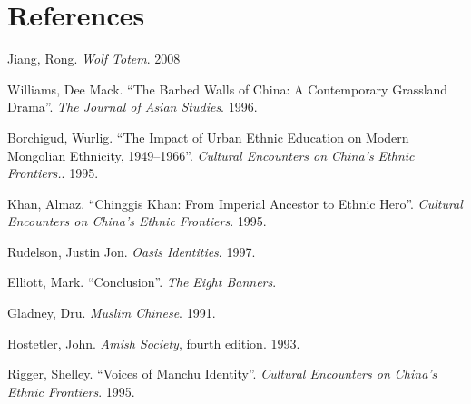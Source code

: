 \section*{References}

\bibent Jiang, Rong. \textit{Wolf Totem}. 2008

\bibent Williams, Dee Mack. ``The Barbed Walls of China: A Contemporary
Grassland Drama''. \textit{The Journal of Asian Studies}. 1996.

\bibent Borchigud, Wurlig. ``The Impact of Urban Ethnic Education on Modern
Mongolian Ethnicity, 1949--1966''. \textit{Cultural Encounters on China's Ethnic
Frontiers.}. 1995.

\bibent Khan, Almaz. ``Chinggis Khan: From Imperial Ancestor to Ethnic Hero''.
\textit{Cultural Encounters on China's Ethnic Frontiers}. 1995.

\bibent Rudelson, Justin Jon. \textit{Oasis Identities}. 1997.

\bibent Elliott, Mark. ``Conclusion''. \textit{The Eight Banners}.

\bibent Gladney, Dru. \textit{Muslim Chinese}. 1991.

\bibent Hostetler, John. \textit{Amish Society}, fourth edition. 1993.

\bibent Rigger, Shelley. ``Voices of Manchu Identity''. \textit{Cultural
Encounters on China's Ethnic Frontiers}. 1995.
